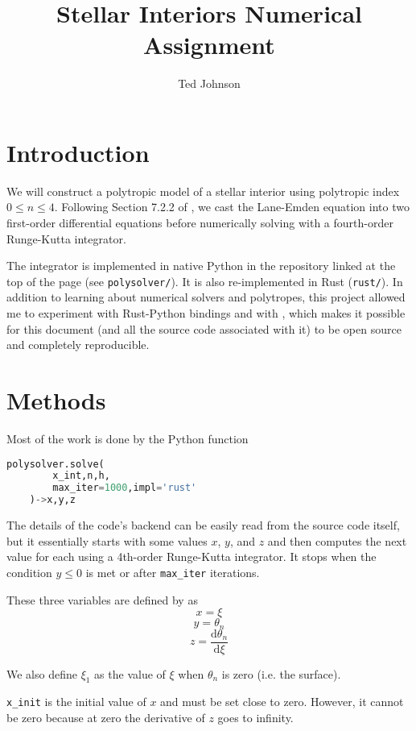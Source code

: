 \documentclass[twocolumn]{aastex631}
\begin{document}
\title{Stellar Interiors Numerical Assignment}

\author{Ted Johnson}


\section{Introduction}
\label{sec:intro}

We will construct a polytropic model of a stellar interior using
polytropic index $0\le n \le 4$. Following Section 7.2.2 of
\citet{textbook}, we cast the Lane-Emden equation into two
first-order differential equations before numerically solving
with a fourth-order Runge-Kutta integrator.

The integrator is implemented in native Python in the repository
linked at the top of the page (see \texttt{polysolver/}). It is
also re-implemented in Rust (\texttt{rust/}). In addition to
learning about numerical solvers and polytropes, this project
allowed me to experiment with Rust-Python bindings and with
\showyourwork, which makes it possible for this document (and
all the source code associated with it) to be open source and completely
reproducible.


\section{Methods}
\label{sec:methods}
Most of the work is done by the Python function
\begin{lstlisting}[language=Python]
    polysolver.solve(
        x_int,n,h,
        max_iter=1000,impl='rust'
    )->x,y,z
\end{lstlisting}

The details of the code's backend can be easily read from
the source code itself, but it essentially starts with some
values $x$, $y$, and $z$ and then computes the next value for
each using a 4th-order Runge-Kutta integrator. It stops when
the condition $y \le 0$ is met or after \texttt{max\_iter} iterations.

These three variables are defined by \citet{textbook} as
\[ x = \xi\]
\[y = \theta_n\]
\[z = \frac{\text{d}\theta_n}{\text{d}\xi}\]

We also define $\xi_1$ as the value of $\xi$ when $\theta_n$ is
zero (i.e. the surface).

\texttt{x\_init} is the initial value of $x$ and must be set close to zero.
However, it cannot be zero because at zero the derivative of $z$ goes to infinity.
\end{document}
